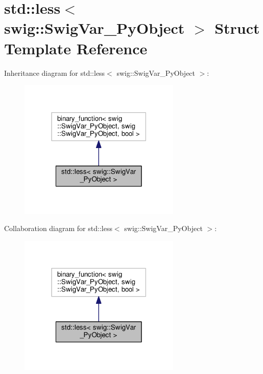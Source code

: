 \hypertarget{structstd_1_1less_3_01swig_1_1SwigVar__PyObject_01_4}{}\section{std\+:\+:less$<$ swig\+:\+:Swig\+Var\+\_\+\+Py\+Object $>$ Struct Template Reference}
\label{structstd_1_1less_3_01swig_1_1SwigVar__PyObject_01_4}


Inheritance diagram for std\+:\+:less$<$ swig\+:\+:Swig\+Var\+\_\+\+Py\+Object $>$\+:\nopagebreak
\begin{figure}[H]
\begin{center}
\leavevmode
\includegraphics[width=218pt]{structstd_1_1less_3_01swig_1_1SwigVar__PyObject_01_4__inherit__graph}
\end{center}
\end{figure}


Collaboration diagram for std\+:\+:less$<$ swig\+:\+:Swig\+Var\+\_\+\+Py\+Object $>$\+:\nopagebreak
\begin{figure}[H]
\begin{center}
\leavevmode
\includegraphics[width=218pt]{structstd_1_1less_3_01swig_1_1SwigVar__PyObject_01_4__coll__graph}
\end{center}
\end{figure}
